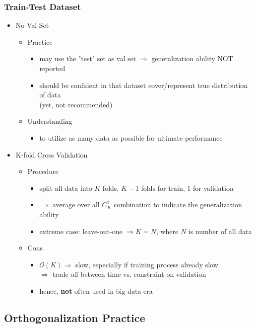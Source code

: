 \subsubsection{Train-Test Dataset}
\begin{itemize}
\item No Val Set
	\begin{itemize}
	\item Practice
		\begin{itemize}
		\item may use the "test" set as val set $\Rightarrow$ generalization ability NOT reported
		\item should be confident in that dataset cover/represent true distribution of data \\ 
		(yet, not recommended)
		\end{itemize}
	\item Understanding
		\begin{itemize}
		\item to utilize as many data as possible for ultimate performance
		\end{itemize}
	\end{itemize}
	
\item K-fold Cross Validation
	\begin{itemize}
	\item Procedure
		\begin{itemize}
		\item split all data into $K$ folds, $K-1$ folds for train, $1$ for validation
		\item $\Rightarrow$ average over all $C^1_K$ combination to indicate the generalization ability
		\item extreme case: leave-out-one $\Rightarrow K=N$, where $N$ is number of all data
		\end{itemize}
	\item Cons
		\begin{itemize}
		\item $\mathcal O(K) \Rightarrow$ slow, especially if training process already slow \\
		$\Rightarrow$ trade off between time vs. constraint on validation
		\item hence, \textbf{not} often used in big data era
		\end{itemize}
	\end{itemize}
\end{itemize}

\subsection{Orthogonalization Practice}
